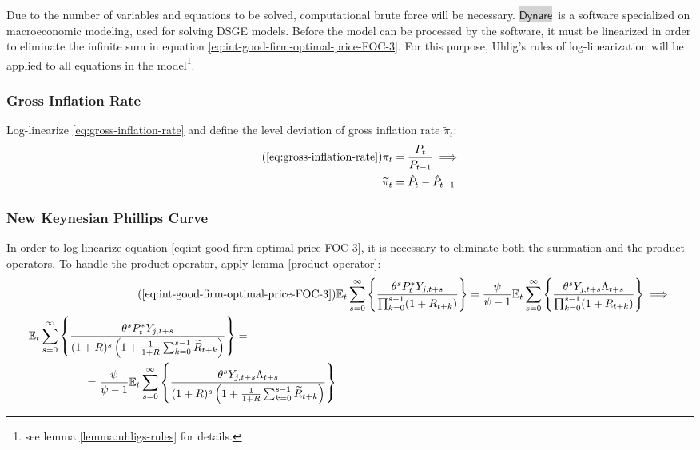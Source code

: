 \documentclass[
	12pt,
	]{article}
\numberwithin{equation}{section}
\newcommand{\E}[1][t]{{\mathbb{E}_{#1}}}
\newcommand{\dynare}{\colorbox{lightgray}{$\mathsf{Dynare}$}}
\theoremstyle{definition}
\theoremstyle{plain}
\theoremstyle{plain}
\theoremstyle{plain}
\begin{document}
Due to the number of variables and equations to be solved, computational brute force will be necessary. \dynare \ is a software specialized on macroeconomic modeling, used for solving DSGE models. Before the model can be processed by the software, it must be linearized in order to eliminate the infinite sum in equation \ref{eq:int-good-firm-optimal-price-FOC-3}. For this purpose, Uhlig's rules of log-linearization \cite{uhlig_toolkit_1999} will be applied to all equations in the model\footnote{see lemma \ref{lemma:uhligs-rules} for details.}.


\subsubsection{Gross Inflation Rate}

Log-linearize \ref{eq:gross-inflation-rate} and define the level deviation of gross inflation rate $\widetilde{\pi}_t$:
\begin{align}
	\tag{\ref{eq:gross-inflation-rate}}
	\pi_t &= \frac{P_t}{P_{t-1}} \implies \\
	\widetilde{\pi}_t &= \hat{P}_t - \hat{P}_{t-1}
	\label{eq:level-dev-gross-inflation-rate}
\end{align}


\subsubsection{New Keynesian Phillips Curve}

In order to log-linearize equation \ref{eq:int-good-firm-optimal-price-FOC-3}, it is necessary to eliminate both the summation and the product operators. To handle the product operator, apply lemma \ref{product-operator}:
\begin{align}
\tag{\ref{eq:int-good-firm-optimal-price-FOC-3}}
	& \E \sum_{s=0}^{\infty} \left\{ \frac{\theta^s P_t^\ast Y_{j,t+s} }{ \prod_{k=0}^{s-1}(1+R_{t+k})} \right\} = \frac{\psi}{\psi-1} \E \sum_{s=0}^{\infty} \left\{ \frac{\theta^s Y_{j,t+s} \Lambda_{t+s}}{\prod_{k=0}^{s-1}(1+R_{t+k})} \right\} \implies
\\
	\begin{split}
		& \E \sum_{s=0}^{\infty} \left\{ \frac{\theta^s P_t^\ast Y_{j,t+s}}{ (1 + R)^s \left( 1 + \frac{1}{1 + R} \sum_{k=0}^{s-1} \widetilde{R}_{t+k} \right) } \right\} = 
	\\ & \quad \quad \quad \quad \quad = \frac{\psi}{\psi-1} \E \sum_{s=0}^{\infty} \left\{ \frac{\theta^s Y_{j,t+s} \Lambda_{t+s}}{ (1 + R)^s \left( 1 + \frac{1}{1 + R} \sum_{k=0}^{s-1} \widetilde{R}_{t+k} \right) } \right\} \label{eq:ll-optimal-price}
	\end{split}
\end{align}
\end{document}
